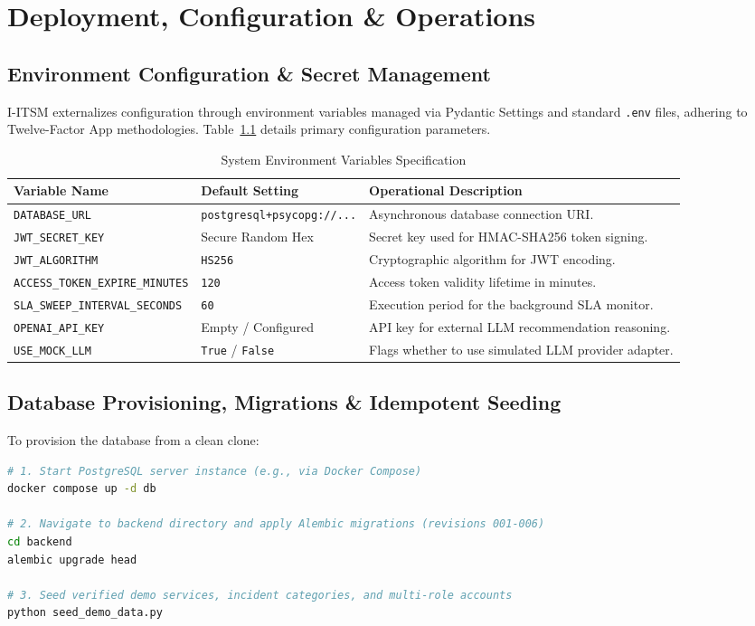 \documentclass[11pt,a4paper,oneside]{report}
\begin{document}
\chapter{Deployment, Configuration \& Operations}
\label{ch:deployment}

\section{Environment Configuration \& Secret Management}
\label{sec:ops_env}
I-ITSM externalizes configuration through environment variables managed via Pydantic Settings and standard \texttt{.env} files, adhering to Twelve-Factor App methodologies. Table~\ref{tab:env_variables} details primary configuration parameters.

\begin{table}[H]
\centering
\small
\caption{System Environment Variables Specification}
\label{tab:env_variables}
\begin{tabular}{p{4.5cm}p{3.0cm}p{7.0cm}}
\toprule
\textbf{Variable Name} & \textbf{Default Setting} & \textbf{Operational Description} \\
\midrule
\texttt{DATABASE\_URL} & \texttt{postgresql+psycopg://...} & Asynchronous database connection URI. \\
\texttt{JWT\_SECRET\_KEY} & Secure Random Hex & Secret key used for HMAC-SHA256 token signing. \\
\texttt{JWT\_ALGORITHM} & \texttt{HS256} & Cryptographic algorithm for JWT encoding. \\
\texttt{ACCESS\_TOKEN\_EXPIRE\_MINUTES}& \texttt{120} & Access token validity lifetime in minutes. \\
\texttt{SLA\_SWEEP\_INTERVAL\_SECONDS} & \texttt{60} & Execution period for the background SLA monitor. \\
\texttt{OPENAI\_API\_KEY} & Empty / Configured & API key for external LLM recommendation reasoning. \\
\texttt{USE\_MOCK\_LLM} & \texttt{True} / \texttt{False} & Flags whether to use simulated LLM provider adapter. \\
\bottomrule
\end{tabular}
\end{table}

\section{Database Provisioning, Migrations \& Idempotent Seeding}
\label{sec:ops_db_setup}
To provision the database from a clean clone:
\begin{lstlisting}[language=bash, caption={Database Migration and Seeding Commands}]
# 1. Start PostgreSQL server instance (e.g., via Docker Compose)
docker compose up -d db

# 2. Navigate to backend directory and apply Alembic migrations (revisions 001-006)
cd backend
alembic upgrade head

# 3. Seed verified demo services, incident categories, and multi-role accounts
python seed_demo_data.py
\end{lstlisting}
\end{document}
